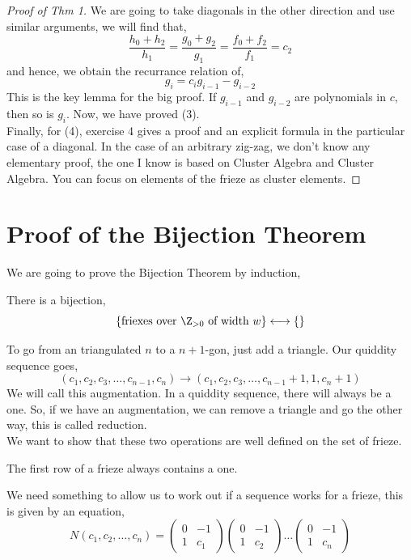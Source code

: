 \documentclass{article}
\begin{document}
\begin{proof}[Proof of Thm 1]
  We are going to take diagonals in the other direction and use similar arguments, we will find that,
  $$ \frac{h_0+h_2}{h_1} = \frac{g_0 + g_2}{g_1} = \frac{f_0 + f_2}{f_1} = c_2 $$
  and hence, we obtain the recurrance relation of,
  $$ g_i = c_ig_{i-1} - g_{i-2} $$
  This is the key lemma for the big proof. If $g_{i-1}$ and $g_{i-2}$ are polynomials in $c$, then so is $g_i$. Now, we have proved (3). \\

  Finally, for (4), exercise 4 gives a proof and an explicit formula in the particular case of a diagonal. In the case of an arbitrary zig-zag, we don't know any elementary proof, the one I know is based on Cluster Algebra and Cluster Algebra. You can focus on elements of the frieze as cluster elements.
\end{proof}

\section{Proof of the Bijection Theorem}
We are going to prove the Bijection Theorem by induction,\\

\begin{nthm}
  There is a bijection,
  $$ \{\text{friexes over $\Z_{>0}$ of width $w$}\} \longleftrightarrow \{\text{}\} $$
\end{nthm}

To go from an triangulated $n$ to a $n+1$-gon, just add a triangle. Our quiddity sequence goes,
$$ (c_1, c_2, c_3, \dots, c_{n-1}, c_n) \to (c_1, c_2, c_3, \dots, c_{n-1}+1, 1, c_n+1) $$
We will call this augmentation. In a quiddity sequence, there will always be a one. So, if we have an augmentation, we can remove a triangle and go the other way, this is called reduction.\\

We want to show that these two operations are well defined on the set of frieze.

\begin{nlemma}[]
  The first row of a frieze always contains a one.
\end{nlemma}

We need something to allow us to work out if a sequence works for a frieze, this is given by an equation,
\begin{equation}
  N(c_1, c_2, \dots, c_n) = \begin{pmatrix}
    0 & -1 \\ 1 & c_1
\end{pmatrix}\begin{pmatrix}
  0 & -1 \\ 1 & c_2
\end{pmatrix} \dots \begin{pmatrix}
  0 & -1 \\ 1 & c_n
\end{pmatrix}
\end{equation}
\end{document}
